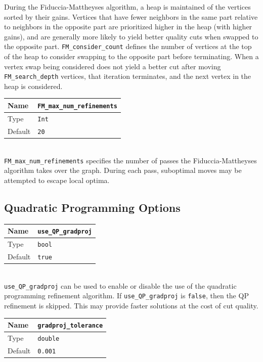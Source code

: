 \documentclass[letter]{article}
\begin{document}
During the Fiduccia-Mattheyses algorithm, a heap is maintained of the vertices sorted by their gains. Vertices that have fewer neighbors in the same part relative to neighbors in the opposite part are prioritized higher in the heap (with higher gains), and are generally more likely to yield better quality cuts when swapped to the opposite part. \texttt{FM\_consider\_count} defines the number of vertices at the top of the heap to consider swapping to the opposite part before terminating. When a vertex swap being considered does not yield a better cut after moving \texttt{FM\_search\_depth} vertices, that iteration terminates, and the next vertex in the heap is considered.

\baselineskip
\begin{tabular}{|l|l|} \hline
Name & \texttt{FM\_max\_num\_refinements} \\ \hline
Type & \texttt{Int} \\ \hline
Default & \texttt{20} \\ \hline
\end{tabular}\\

\texttt{FM\_max\_num\_refinements} specifies the number of passes the Fiduccia-Mattheyses algorithm takes over the graph. During each pass, suboptimal moves may be attempted to escape local optima.

\subsection{Quadratic Programming Options}

\begin{tabular}{|l|l|} \hline
Name & \texttt{use\_QP\_gradproj} \\ \hline
Type & \texttt{bool} \\ \hline
Default & \texttt{true} \\ \hline
\end{tabular}\\

\texttt{use\_QP\_gradproj} can be used to enable or disable the use of the quadratic programming refinement algorithm. If \texttt{use\_QP\_gradproj} is \texttt{false}, then the QP refinement is skipped. This may provide faster solutions at the cost of cut quality.\\
\baselineskip
\begin{tabular}{|l|l|} \hline
Name & \texttt{gradproj\_tolerance} \\ \hline
Type & \texttt{double} \\ \hline
Default & \texttt{0.001} \\ \hline
\end{tabular}\\
\end{document}

